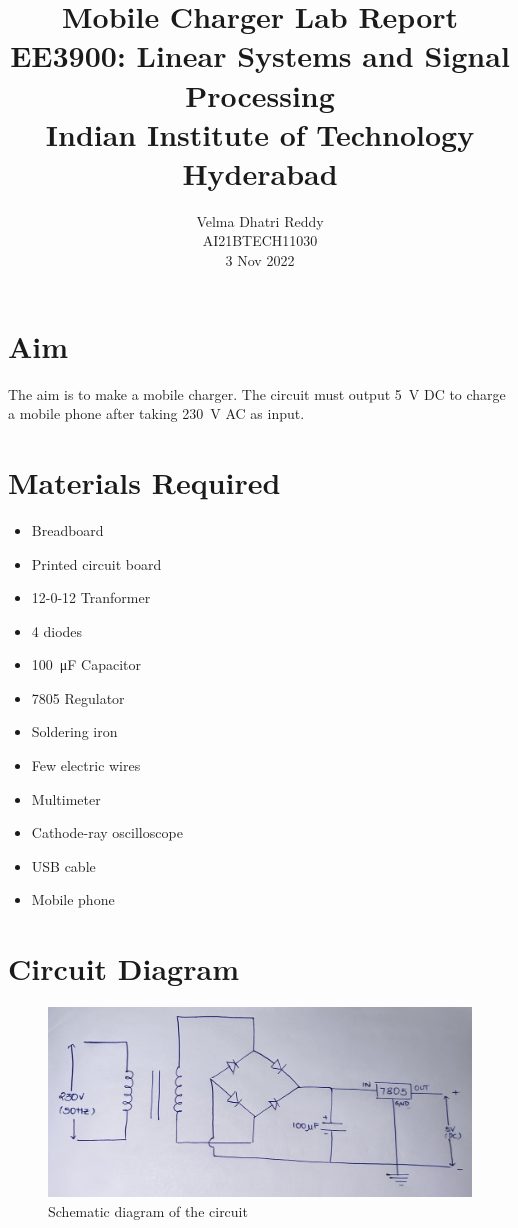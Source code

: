 \documentclass[journal,12pt,twocolumn]{IEEEtran}
\title{Mobile Charger Lab Report \\ \Large EE3900: Linear Systems and Signal Processing \\ \large Indian Institute of Technology Hyderabad}
\author{Velma Dhatri Reddy \\ \normalsize AI21BTECH11030 \\ \vspace*{20pt} \normalsize 3 Nov 2022}
\numberwithin{equation}{section}
\numberwithin{figure}{section}
\begin{document}
	\maketitle

	\section{Aim}
	The aim is to make a mobile charger. The circuit must output \SI{5}{\volt} DC to charge a mobile phone after taking \SI{230}{\volt} AC as input.
	
	\section{Materials Required}
	\begin{itemize}
	\item Breadboard
	\item Printed circuit board
	\item 12-0-12 Tranformer
	\item 4 diodes
	\item \SI{100}{\micro\farad} Capacitor
	\item 7805 Regulator
	\item Soldering iron
	\item Few electric wires
	\item Multimeter
	\item Cathode-ray oscilloscope
	\item USB cable
	\item Mobile phone
	\end{itemize}

	\section{Circuit Diagram}
	\begin{figure}[!ht]
		\centering
		\includegraphics[width=\columnwidth]{./figs/circuit.jpg}
		\caption{Schematic diagram of the circuit}
		\label{fig-ckt}	
	\end{figure}
	
\end{document}

